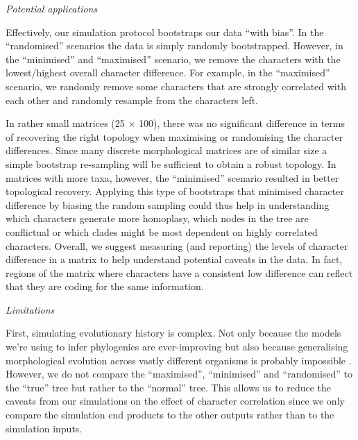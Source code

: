 \documentclass[12pt,letterpaper]{article}
\renewcommand{\subsection}[1]{%
\bigskip
\begin{center}
\begin{large}
\normalfont\itshape #1
\end{large}
\end{center}}
\begin{document}
\subsection{Potential applications}
Effectively, our simulation protocol bootstraps our data ``with bias''.
In the ``randomised'' scenarios the data is simply randomly bootstrapped.
However, in the ``minimised'' and ``maximised'' scenario, we remove the characters with the lowest/highest overall character difference.
For example, in the ``maximised'' scenario, we randomly remove some characters that are strongly correlated with each other and randomly resample from the characters left.

In rather small matrices (25 $\times$ 100), there was no significant difference in terms of recovering the right topology when maximising or randomising the character differences.
Since many discrete morphological matrices are of similar size \citep{guillerme2016assessment} a simple bootstrap re-sampling
will be sufficient to obtain a robust topology.
In matrices with more taxa, however, the ``minimised'' scenario resulted in better topological recovery.
Applying this type of bootstraps that minimised character difference by biasing the random sampling could thus help in understanding which characters generate more homoplasy, which nodes in the tree are conflictual or which clades might be most dependent on highly correlated characters. 
Overall, we suggest measuring (and reporting) the levels of character difference in a matrix to help understand potential caveats in the data.
In fact, regions of the matrix where characters have a consistent low difference can reflect that they are coding for the same information.

\subsection{Limitations}
First, simulating evolutionary history is complex.
Not only because the models we're using to infer phylogenies are ever-improving \citep[e.g.][]{heath2014fossilized,Wright01072016} but also because generalising morphological evolution across vastly different organisms is probably impossible \citep[see constrasted discussions from][]{GoloboffEmpirical,OReillyEmpirical}.
However, we do not compare the ``maximised'', ``minimised'' and ``randomised'' to the ``true'' tree but rather to the ``normal'' tree.
This allows us to reduce the caveats from our simulations on the effect of character correlation since we only compare the simulation end products to the other outputs rather than to the simulation inputs.
 
\end{document}
